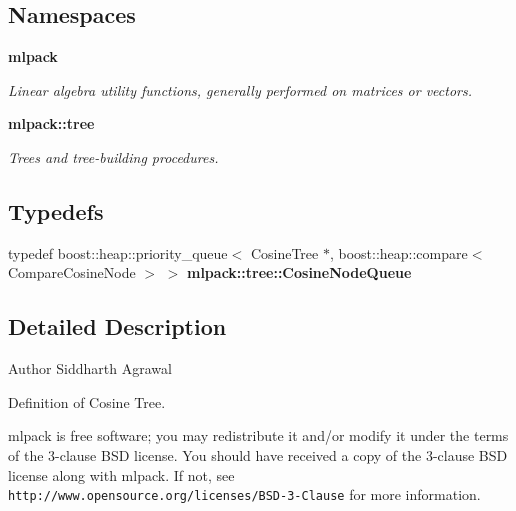 \subsection*{Namespaces}
\begin{DoxyCompactItemize}
\item 
 {\bf mlpack}
\begin{DoxyCompactList}\small\item\em Linear algebra utility functions, generally performed on matrices or vectors. \end{DoxyCompactList}\item 
 {\bf mlpack\+::tree}
\begin{DoxyCompactList}\small\item\em Trees and tree-\/building procedures. \end{DoxyCompactList}\end{DoxyCompactItemize}
\subsection*{Typedefs}
\begin{DoxyCompactItemize}
\item 
typedef boost\+::heap\+::priority\+\_\+queue$<$ Cosine\+Tree $\ast$, boost\+::heap\+::compare$<$ Compare\+Cosine\+Node $>$ $>$ {\bf mlpack\+::tree\+::\+Cosine\+Node\+Queue}
\end{DoxyCompactItemize}


\subsection{Detailed Description}
\begin{DoxyAuthor}{Author}
Siddharth Agrawal
\end{DoxyAuthor}
Definition of Cosine Tree.

mlpack is free software; you may redistribute it and/or modify it under the terms of the 3-\/clause B\+SD license. You should have received a copy of the 3-\/clause B\+SD license along with mlpack. If not, see {\tt http\+://www.\+opensource.\+org/licenses/\+B\+S\+D-\/3-\/\+Clause} for more information. 